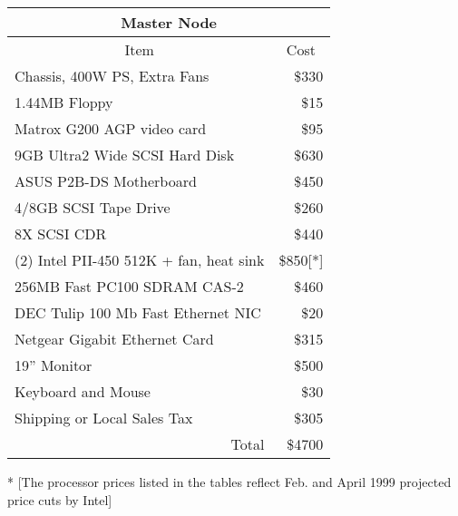 \begin{tabular}{|l|r|} \hline \hline
\multicolumn{2}{|c|}{Master Node} \\ \hline \hline
\multicolumn{1}{|c}{Item} & \multicolumn{1}{c|}{Cost} \\ \hline
Chassis, 400W PS, Extra Fans & \$330 \\ \hline
1.44MB Floppy & \$15 \\ \hline
Matrox G200 AGP video card & \$95 \\ \hline
9GB Ultra2 Wide SCSI Hard Disk & \$630 \\ \hline
ASUS P2B-DS Motherboard & \$450 \\ \hline
4/8GB SCSI Tape Drive & \$260 \\ \hline
8X SCSI CDR & \$440 \\ \hline
(2) Intel PII-450 512K + fan, heat sink & \$850[*] \\ \hline
256MB Fast PC100 SDRAM CAS-2 & \$460 \\ \hline
DEC Tulip 100 Mb Fast Ethernet NIC & \$20 \\ \hline
Netgear Gigabit Ethernet Card & \$315 \\ \hline
19'' Monitor & \$500 \\ \hline
Keyboard and Mouse & \$30 \\ \hline
Shipping or Local Sales Tax & \$305 \\ \hline
\multicolumn{1}{|r|}{Total} & \multicolumn{1}{r|}{\$4700} \\ \hline
\end{tabular}

\noindent
*  [The processor prices listed in the tables reflect
     Feb. and April 1999  projected price cuts by Intel]

\bigskip


